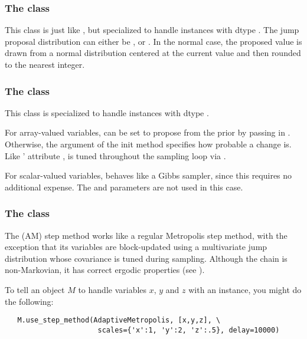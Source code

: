 \subsubsection[The DiscreteMetropolis class]{The
 class}
This class is just like , but specialized to handle
 instances with dtype . The jump proposal
distribution can either be ,  or . In the
normal case, the proposed value is drawn from a normal distribution
centered at the current value and then rounded to the
nearest integer.

\subsubsection[The BinaryMetropolis class]{The
 class} 
This class is specialized to handle  instances with dtype . 

For array-valued variables,  can be set to propose from the prior by passing in . Otherwise, the argument  of the init method specifies how probable a change is. Like ' attribute ,  is tuned throughout the sampling loop via .

For scalar-valued variables,  behaves like a Gibbs sampler, since this requires no additional expense. The  and  parameters are not used in this case.

\subsubsection[The AdaptiveMetropolis class]{The
 class} 
\label{subsec:AM}
The  (AM) step method works like a regular Metropolis step method, with the exception that its variables are block-updated using a multivariate jump distribution whose covariance is tuned during sampling. Although the chain is non-Markovian, it has correct ergodic properties (see \cite{Haario:2001lr}).

To tell an  object $M$ to handle variables $x$, $y$ and $z$ with an  instance, you might do the following:
\begin{verbatim}
   M.use_step_method(AdaptiveMetropolis, [x,y,z], \
                      scales={'x':1, 'y':2, 'z':.5}, delay=10000)
\end{verbatim}

